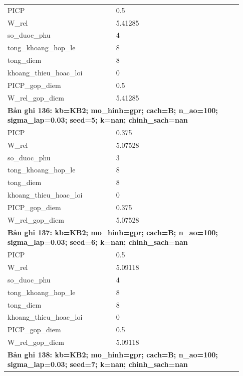 \begin{longtable}{p{0.43\linewidth}p{0.50\linewidth}}
PICP & 0.5 \\
W\_\allowbreak rel & 5.41285 \\
so\_\allowbreak duoc\_\allowbreak phu & 4 \\
tong\_\allowbreak khoang\_\allowbreak hop\_\allowbreak le & 8 \\
tong\_\allowbreak diem & 8 \\
khoang\_\allowbreak thieu\_\allowbreak hoac\_\allowbreak loi & 0 \\
PICP\_\allowbreak gop\_\allowbreak diem & 0.5 \\
W\_\allowbreak rel\_\allowbreak gop\_\allowbreak diem & 5.41285 \\
\midrule
\multicolumn{2}{p{0.95\linewidth}}{\textbf{Bản ghi 136: kb=KB2; mo\_hinh=gpr; cach=B; n\_ao=100; sigma\_lap=0.03; seed=5; k=nan; chinh\_sach=nan}} \\
PICP & 0.375 \\
W\_\allowbreak rel & 5.07528 \\
so\_\allowbreak duoc\_\allowbreak phu & 3 \\
tong\_\allowbreak khoang\_\allowbreak hop\_\allowbreak le & 8 \\
tong\_\allowbreak diem & 8 \\
khoang\_\allowbreak thieu\_\allowbreak hoac\_\allowbreak loi & 0 \\
PICP\_\allowbreak gop\_\allowbreak diem & 0.375 \\
W\_\allowbreak rel\_\allowbreak gop\_\allowbreak diem & 5.07528 \\
\midrule
\multicolumn{2}{p{0.95\linewidth}}{\textbf{Bản ghi 137: kb=KB2; mo\_hinh=gpr; cach=B; n\_ao=100; sigma\_lap=0.03; seed=6; k=nan; chinh\_sach=nan}} \\
PICP & 0.5 \\
W\_\allowbreak rel & 5.09118 \\
so\_\allowbreak duoc\_\allowbreak phu & 4 \\
tong\_\allowbreak khoang\_\allowbreak hop\_\allowbreak le & 8 \\
tong\_\allowbreak diem & 8 \\
khoang\_\allowbreak thieu\_\allowbreak hoac\_\allowbreak loi & 0 \\
PICP\_\allowbreak gop\_\allowbreak diem & 0.5 \\
W\_\allowbreak rel\_\allowbreak gop\_\allowbreak diem & 5.09118 \\
\midrule
\multicolumn{2}{p{0.95\linewidth}}{\textbf{Bản ghi 138: kb=KB2; mo\_hinh=gpr; cach=B; n\_ao=100; sigma\_lap=0.03; seed=7; k=nan; chinh\_sach=nan}} \\

\end{longtable}
